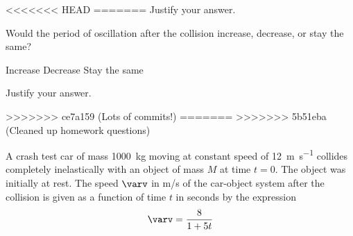 \documentclass{../../oss-apphys-exam}
\begin{document}
\begin{questions}
\begin{questions}
\begin{parts}
\begin{subparts}
<<<<<<< HEAD
=======
      \vspace{.1in}Justify your answer.
      \vspace{\stretch1}
      
      \subpart Would the period of oscillation after the collision increase,
      decrease, or stay the same?

      \vspace{.1in}
      \underline{\hspace{.3in}} Increase\hspace{.6in}
      \underline{\hspace{.3in}} Decrease\hspace{.6in}
      \underline{\hspace{.3in}} Stay the same

      \vspace{.1in}Justify your answer.
      \vspace{\stretch1}
    \end{subparts}
>>>>>>> ce7a159 (Lots of commits!)
=======
>>>>>>> 5b51eba (Cleaned up homework questions)
  \end{parts}
  \newpage
  
  \question A crash test car of mass \SI{1000}{\kilo\gram} moving at constant
  speed of \SI{12}{\metre\per\second} collides completely inelastically with an
  object of mass $M$ at time $t=0$. The object was initially at rest. The speed
  $\varv$ in m/s of the car-object system after the collision is given as a
  function of time $t$ in seconds by the expression
  \begin{displaymath}
    \varv=\frac8{1 + 5t}
  \end{displaymath}
\end{questions}
\end{questions}
\end{document}
